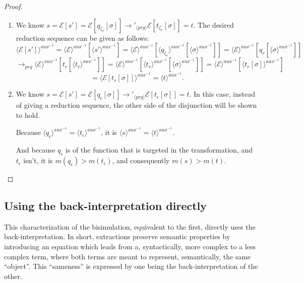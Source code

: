 \begin{proposition}
\begin{proof}
\begin{enumerate}
\item We know $s = \mathcal{E}[s'] = \mathcal{E}[q_{\zeta_r}[\sigma]] \longrightarrow'_{\langle prg \rangle} \mathcal{E}[t_{\zeta_r}[\sigma]] = t$. The desired reduction sequence can be given as follows:
\[
\langle \mathcal{E}[s'] \rangle^{aux^{-1}} = \langle \mathcal{E} \rangle^{aux^{-1}}[\langle s' \rangle^{aux^{-1}}] = \langle \mathcal{E} \rangle^{aux^{-1}}[\langle q_{\zeta_r} \rangle^{aux^{-1}}[\langle \sigma \rangle^{aux^{-1}}]] = \langle \mathcal{E} \rangle^{aux^{-1}}[q_r[\langle \sigma \rangle^{aux^{-1}}]]
\]
\[
\longrightarrow_{prg} \langle \mathcal{E} \rangle^{aux^{-1}}[t_r[\langle t_r \rangle^{aux^{-1}}]] = \langle \mathcal{E} \rangle^{aux^{-1}}[\langle t_r \rangle^{aux^{-1}}[\langle \sigma \rangle^{aux^{-1}}]] = \langle \mathcal{E} \rangle^{aux^{-1}}[\langle t_r[\sigma] \rangle^{aux^{-1}}]
\]
\[
= \langle \mathcal{E}[t_r[\sigma]] \rangle^{aux^{-1}} = \langle t \rangle^{aux^{-1}}.
\]

\item We know $s = \mathcal{E}[s'] = \mathcal{E}[q_\epsilon[\sigma]] \longrightarrow'_{\langle prg \rangle} \mathcal{E}[t_\epsilon[\sigma]] = t$. In this case, instead of giving a reduction sequence, the other side of the disjunction will be shown to hold.

Because $\langle q_\epsilon \rangle^{aux^{-1}} = \langle t_\epsilon \rangle^{aux^{-1}}$, it is $\langle s \rangle^{aux^{-1}} = \langle t \rangle^{aux^{-1}}$.

And because $q_\epsilon$ is of the function that is targeted in the transformation, and $t_\epsilon$ isn't, it is $m(q_\epsilon) > m(t_\epsilon)$, and consequently $m(s) > m(t)$.
\end{enumerate}
\end{proof}
\end{proposition}

\subsection{Using the back-interpretation directly}

This characterization of the bisimulation, equivalent to the first, directly uses the back-interpretation. In short, extractions preserve semantic properties by introducing an equation which leads from a, syntactically, more complex to a less complex term, where both terms are meant to represent, semantically, the same ``object''. This ``sameness'' is expressed by one being the back-interpretation of the other.

